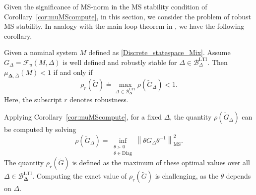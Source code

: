 Given the significance of MS-norm in the MS stability condition of Corollary~\ref{cor:muMScompute}, in this section, we consider the problem of robust MS stability. In analogy with the main loop theorem in \cite{packard_mainloop}, we have the following corollary,
\begin{cor}\label{cor:MS_specr}
Given a nominal system $M$ defined as \ref{Discrete_statespace_Mix}. Assume $G_\Delta= \mathcal{F}_u(M, \Delta)$ is well defined and robustly stable for $\Delta\in\mathcal{B}_\Delta^{\mathrm{LTI}}$. Then \(\mu_{\bm{\Delta},\bar{\Delta}} (M) < 1\) if and only if 
\begin{equation*}
    \rho_{r}(\tilde{G})\doteq \max_{\Delta \in \mathcal{B}_{\bm{\Delta}}^{\mathrm{LTI}}}\rho(\tilde{G}_{\Delta}) < 1.
\end{equation*}
Here, the subscript $r$ denotes robustness.
\end{cor}

Applying Corollary~\ref{cor:muMScompute}, for a fixed $\Delta$, the quantity 
$\rho(\tilde{G}_\Delta)$ can be computed by solving
\[
\rho(\tilde{G}_\Delta)
= \inf_{\substack{\theta \succ 0 \\ \theta \in \mathrm{Diag}}}
\left\| \theta G_\Delta \theta^{-1} \right\|_{\mathrm{MS}}^2.
\]
The quantity $\rho_r(\tilde{G})$ is defined as the maximum of these optimal values 
over all $\Delta\in\mathcal{B}_{\bm{\Delta}}^{\mathrm{LTI}}$. Computing the exact value of $\rho_r(\tilde{G})$ is 
challenging, as the $\theta$ depends on $\Delta$.




